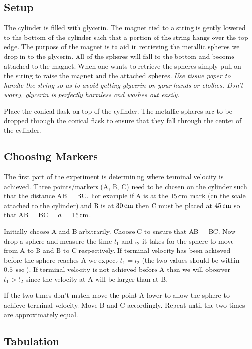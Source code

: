 \subsection*{Setup}

   The cylinder is filled with glycerin. The magnet tied to a string is gently lowered to the bottom of the cylinder such that a portion of the string hangs over the top edge. The purpose of the magnet is to aid in retrieving the metallic spheres we drop in to the glycerin. All of the spheres will fall to the bottom and become attached to the magnet. When one wants to retrieve the spheres simply pull on the string to raise the magnet and the attached spheres. \textit{Use tissue paper to handle the string so as to avoid getting glycerin on your hands or clothes. Don't worry, glycerin is perfectly harmless and washes out easily.}

   Place the conical flask on top of the cylinder. The metallic spheres are to be dropped through the conical flask to ensure that they fall through the center of the cylinder.

\subsection*{Choosing Markers}

   The first part of the experiment is determining where terminal velocity is achieved. Three points/markers (A, B, C) need to be chosen on the cylinder such that the distance AB = BC. For example if A is at the $15 \, \si{\centi \metre}$ mark (on the scale attached to the cylinder) and B is at $30 \, \si{\centi \metre}$ then C must be placed at $45 \, \si{\centi \metre}$ so that AB = BC = $d$ = $15 \, \si{\centi \metre}$.

   

   Initially choose A and B arbitrarily. Choose C to ensure that AB = BC. Now drop a sphere and measure the time $t_1$ and $t_2$ it takes for the sphere to move from A to B and B to C respectively. If terminal velocity has been achieved before the sphere reaches A we expect $t_1 = t_2$ (the two values should be within $0.5 \, \sec$). If terminal velocity is not achieved before A then we will observer $t_1 > t_2$ since the velocity at A will be larger than at B.

   If the two times don't match move the point A lower to allow the sphere to achieve terminal velocity. Move B and C accordingly. Repeat until the two times are approximately equal.

\subsection*{Tabulation}

